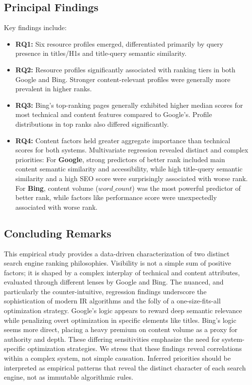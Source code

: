 \documentclass[a4paper,fleqn]{cas-sc}
\begin{document}
\subsection{Principal Findings}
\label{subsec:conclusion_summary}
Key findings include:
\begin{itemize}
\item \textbf{RQ1:} Six resource profiles emerged, differentiated primarily by query presence in titles/H1s and title-query semantic similarity.
\item \textbf{RQ2:} Resource profiles significantly associated with ranking tiers in both Google and Bing. Stronger content-relevant profiles were generally more prevalent in higher ranks.
\item \textbf{RQ3:} Bing's top-ranking pages generally exhibited higher median scores for most technical and content features compared to Google's. Profile distributions in top ranks also differed significantly.
\item \textbf{RQ4:} Content factors held greater aggregate importance than technical scores for both systems. Multivariate regression revealed distinct and complex priorities: For \textbf{Google}, strong predictors of better rank included main content semantic similarity and accessibility, while high title-query semantic similarity and a high SEO score were surprisingly associated with worse rank. For \textbf{Bing}, content volume ($word\_count$) was the most powerful predictor of better rank, while factors like performance score were unexpectedly associated with worse rank.
\end{itemize}

\subsection{Concluding Remarks}
\label{subsec:conclusion_remarks}
This empirical study provides a data-driven characterization of two distinct search engine ranking philosophies. Visibility is not a simple sum of positive factors; it is shaped by a complex interplay of technical and content attributes, evaluated through different lenses by Google and Bing. The nuanced, and particularly the counter-intuitive, regression findings underscore the sophistication of modern IR algorithms and the folly of a one-size-fits-all optimization strategy. Google's logic appears to reward deep semantic relevance while penalizing overt optimization in specific elements like titles. Bing's logic seems more direct, placing a heavy premium on content volume as a proxy for authority and depth. These differing sensitivities emphasize the need for system-specific optimization strategies. We stress that these findings reveal correlations within a complex system, not simple causation. Inferred priorities should be interpreted as empirical patterns that reveal the distinct character of each search engine, not as immutable algorithmic rules.
\end{document}
